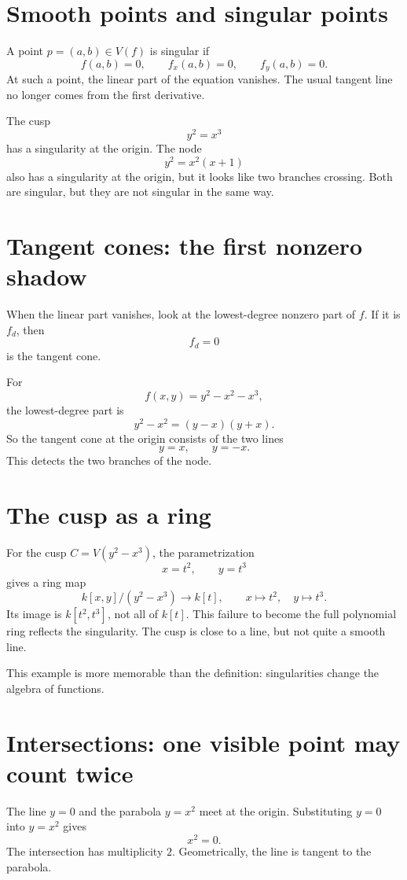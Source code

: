 \section{Smooth points and singular points}

A point \(p=(a,b)\in V(f)\) is singular if
\[
  f(a,b)=0,
  \qquad
  f_x(a,b)=0,
  \qquad
  f_y(a,b)=0.
\]
At such a point, the linear part of the equation vanishes. The usual tangent line no longer comes from the first derivative.

The cusp
\[
  y^2=x^3
\]
has a singularity at the origin. The node
\[
  y^2=x^2(x+1)
\]
also has a singularity at the origin, but it looks like two branches crossing. Both are singular, but they are not singular in the same way.

\section{Tangent cones: the first nonzero shadow}

When the linear part vanishes, look at the lowest-degree nonzero part of \(f\). If it is \(f_d\), then
\[
  f_d=0
\]
is the tangent cone.

For
\[
  f(x,y)=y^2-x^2-x^3,
\]
the lowest-degree part is
\[
  y^2-x^2=(y-x)(y+x).
\]
So the tangent cone at the origin consists of the two lines
\[
  y=x,
  \qquad
  y=-x.
\]
This detects the two branches of the node.

\section{The cusp as a ring}

For the cusp \(C=V(y^2-x^3)\), the parametrization
\[
  x=t^2,
  \qquad
  y=t^3
\]
gives a ring map
\[
  k[x,y]/(y^2-x^3)\longrightarrow k[t],
  \qquad
  x\mapsto t^2,
  \quad
  y\mapsto t^3.
\]
Its image is \(k[t^2,t^3]\), not all of \(k[t]\). This failure to become the full polynomial ring reflects the singularity. The cusp is close to a line, but not quite a smooth line.

This example is more memorable than the definition: singularities change the algebra of functions.

\section{Intersections: one visible point may count twice}

The line \(y=0\) and the parabola \(y=x^2\) meet at the origin. Substituting \(y=0\) into \(y=x^2\) gives
\[
  x^2=0.
\]
The intersection has multiplicity \(2\). Geometrically, the line is tangent to the parabola.

